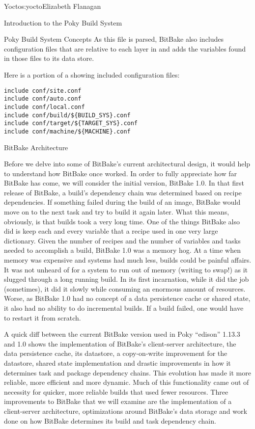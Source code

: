 \begin{aosachapter}{Yocto}{s:yocto}{Elizabeth Flanagan}
\begin{aosasect1}{Introduction to the Poky Build System}
\begin{aosasect2}{Poky Build System Concepts}
As this file is parsed, BitBake also includes
configuration files that are relative to each layer in  and
adds the variables found in those files to its data store.

Here is a portion of a  showing included configuration files:

\begin{verbatim}
include conf/site.conf
include conf/auto.conf
include conf/local.conf
include conf/build/${BUILD_SYS}.conf
include conf/target/${TARGET_SYS}.conf
include conf/machine/${MACHINE}.conf
\end{verbatim}

\end{aosasect2}

\end{aosasect1}

\begin{aosasect1}{BitBake Architecture}

Before we delve into some of BitBake's current architectural design,
it would help to understand how BitBake once worked. In
order to fully appreciate how far BitBake has come, we will consider the
initial version, BitBake 1.0. In that first release of BitBake, a
build's dependency chain was determined based on recipe
dependencies. If something failed during the build of an image,
BitBake would move on to the next task and try to build it again later.
What this means, obviously, is that builds took a very long time. One
of the things BitBake also did is keep each and every variable that a
recipe used in one very large dictionary. Given the number of recipes
and the number of variables and tasks needed to accomplish a build,
BitBake 1.0 was a memory hog. At a time when memory was expensive and
systems had much less, builds could be painful affairs. It was not
unheard of for a system to run out of memory (writing to swap!)  as it
slugged through a long running build. In its first incarnation, while
it did the job (sometimes), it did it slowly while consuming an enormous
amount of resources. Worse, as BitBake 1.0 had no concept of a data persistence
cache or shared state, it also had no ability to do incremental
builds. If a build failed, one would have to restart it from
scratch.

A quick diff between the current BitBake version used in Poky
``edison'' 1.13.3 and 1.0 shows the implementation of BitBake's
client-server architecture, the data persistence cache, its datastore,
a copy-on-write improvement for the datastore, shared state
implementation and drastic improvements in how it determines task
and package dependency chains. This evolution has made it more
reliable, more efficient and more dynamic. Much of this functionality
came out of necessity for quicker, more reliable builds that used fewer
resources. Three improvements to BitBake that we will examine are the
implementation of a client-server architecture, optimizations around
BitBake's data storage and work done on how BitBake determines its
build and task dependency chain.


\end{aosasect1}
\end{aosachapter}
